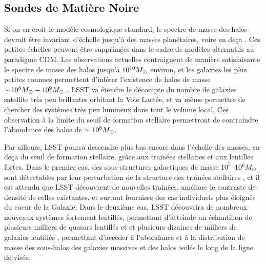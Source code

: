 \documentclass[12pt]{article}
\begin{document}

\vspace{-1em} \subsection*{Sondes de Matière Noire} \vspace{-0.5em}

Si on en croit le modèle cosmologique standard, le spectre de masse des halos devrait être invariant d'échelle jusqu'à des masses planétaires, voire en deça \citep[par exemple]{Green:2003un,2005Natur.433..389D,1412.5930}. Ces petites échelles peuvent être supprimées dans le cadre de modèles alternatifs au paradigme CDM.
Les observations actuelles contraignent de manière satisfaisante le spectre de masse des halos jusqu'à $10^{10}M_\odot$ environ, et les galaxies les plus petites connues permettent d'inférer l'existence de halos de masse $ {\sim}\, 10^8 M_\odot - 10^9 M_\odot$ \citep{2017MNRAS.467.2019R,behroozi2018,Jethwa:2018,Kim:2017iwr,Nadler:2018,1807.07093}. 
LSST va étendre le décompte du nombre de galaxies satellite très peu brillantes orbitant la Voie Lactée, et va même permettre de chercher des systèmes très peu lumineux dans tout le volume local. Ces observation à la limite du seuil de formation stellaire permettront de contraindre l'abondance des halos de $\sim10^8 M_\odot$.

Par ailleurs, LSST pourra descendre plus bas encore dans l'échelle des masses, en-deça du seuil de formation stellaire, grâce aux trainées stellaires et aux lentilles fortes. Dans le premier cas, des sous-structures galactiques de masse $10^5$--$10^6 M_\odot$ sont détectables par leur perturbation de la structure des trainées stellaires \citep[][]{erkal2016,bovy:2017}, et il est attendu que LSST découvrent de nouvelles trainées, améliore le contraste de densité de celles existantes, et surtout fournisse des cas individuels plus éloignés du coeur de la Galaxie. Dans le deuxième cas, LSST découvrira de nombreux nouveaux systèmes fortement lentillés, permettant d'atteinde un échantillon de plusieurs milliers de quasars lentillés \citep{O+M10} et et plusieurs dizaines de milliers de galaxies lentillés \citep{Collett2015}, permettant d'accéder à l'abondance et à la distribution de masse des sous-halos des galaxies massives et des halos isolés le long de la ligne de visée.
\end{document}
